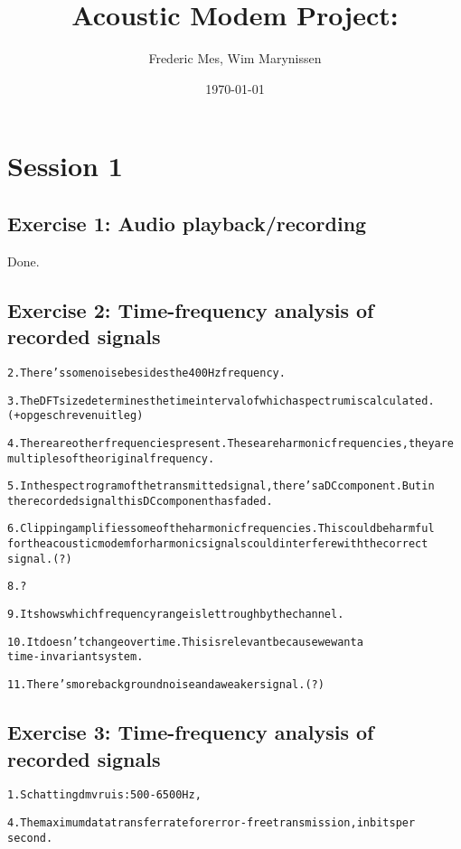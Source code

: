 \documentclass[a4paper,11pt]{article}
\title{ Acoustic Modem Project:}
\author{Frederic Mes, Wim Marynissen}
\date{\today}
\begin{document}
\maketitle
\section{Session 1}
\subsection{Exercise 1: Audio playback/recording}
Done.


\subsection{Exercise 2: Time-frequency analysis of recorded signals}
\begin{alltt}
	2.	There's some noise besides the 400Hz frequency.
	
	3.	The DFT size determines the time interval of which a spectrum is calculated.
		(+ opgeschreven uitleg)
		
	4.	There are other frequencies present. These are harmonic frequencies, they are
	multiples of the original frequency.
	
	5.	In the spectrogram of the transmitted signal, there's a DC component. But in
	the recorded signal this DC component has faded. 
	
	6.	Clipping amplifies some of the harmonic frequencies. This could be harmful
	for the acoustic modem for harmonic signals could interfere with the correct
	signal. (?)
	
	8.	?
	
	9. It shows which frequency range is let trough by the channel.
	
	10. It doesn't change over time. This is relevant because we want a
	time-invariant system.
	
	11. There's more background noise and a weaker signal. (?)
\end{alltt}

\subsection{Exercise 3: Time-frequency analysis of recorded signals}
\begin{alltt}
1. Schatting dmv ruis: 500-6500 Hz,

4. The maximum data transfer rate for error-free transmission, in bits per
second.
\end{alltt}
\end{document}
